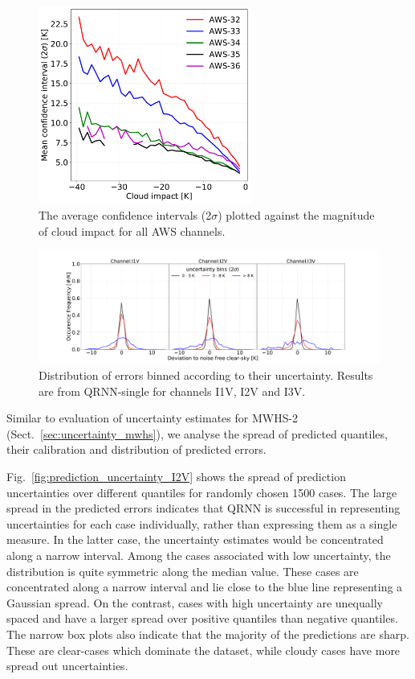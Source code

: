 \documentclass[amt, manuscript]{copernicus}
\begin{document}
\begin{figure}[t]
	\includegraphics[width = 70mm]{Figures/cloud_impact_uncertainty_AWS.pdf}	
	\caption{The average confidence intervals (2$\sigma$) plotted against the magnitude of cloud impact for all AWS channels.}
	\label{fig:uncertainty_cloud_impact}	
\end{figure}
\begin{figure}[t]
	\includegraphics[width=\textwidth]{Figures/PDF_uncertainty_bins_QRNN-single.pdf}	
	\caption{Distribution of errors binned according to their uncertainty. Results are from QRNN-single for channels I1V, I2V and I3V.}
	\label{fig:error_distribution_uncertainty_bins}	
\end{figure}

Similar to evaluation of uncertainty estimates for MWHS-2 (Sect.~\ref{sec:uncertainty_mwhs}), we analyse the spread of predicted quantiles, their calibration and distribution of predicted errors. 

Fig.~\ref{fig:prediction_uncertainty_I2V} shows the spread of prediction uncertainties over different quantiles for randomly chosen 1500 cases. The large spread in the predicted errors indicates that QRNN is successful in representing uncertainties for each case individually, rather than expressing them as a single measure. In the latter case, the uncertainty estimates would be concentrated along a narrow interval. Among the cases associated with low uncertainty, the distribution is quite symmetric along the median value. These cases are concentrated along a narrow interval and lie close to the blue line representing a Gaussian spread. On the contrast, cases with high uncertainty are unequally spaced and have a larger spread over positive quantiles than negative quantiles. The narrow box plots also indicate that the majority of the predictions are sharp. These are clear-cases which dominate the dataset, while cloudy cases have more spread out uncertainties. 
\end{document}

